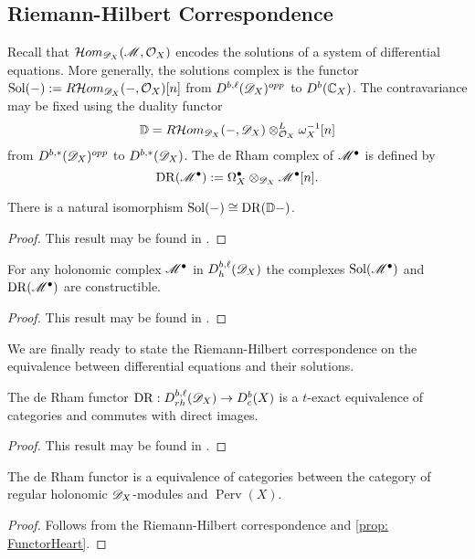 \subsection{Riemann-Hilbert Correspondence}
  Recall that $\mathcal{H}om_{\mathscr{D}_X}(\mathscr{M}, \mathcal{O}_X)$ encodes the solutions of a system of differential equations.
  More generally, the solutions complex is the functor $\operatorname{Sol}({-}) := R \mathcal{H}om_{\mathscr{D}_X}({-},\mathcal{O}_X)[n]$ from $D^{b,\ell}(\mathscr{D}_X)^{opp}$ to $D^{b}(\mathbb{C}_X)$.
  The contravariance may be fixed using the duality functor
  $$\mathbb{D} = R\mathcal{H}om_{\mathscr{D}_X}({-},\mathscr{D}_X)\otimes_{\mathcal{O}_X}^L\omega_X^{-1}[n]$$
  from $D^{b,*}(\mathscr{D}_X)^{opp}$ to $D^{b,*}(\mathscr{D}_X)$.
  The de Rham complex of $\mathscr{M}^\bullet$ is defined by
  $$\operatorname{DR}(\mathscr{M}^\bullet):=\Omega_X^\bullet \otimes_{\mathscr{D}_X} \mathscr{M}^\bullet[n]. $$
  \begin{proposition}
    There is a natural isomorphism $\operatorname{Sol}({-}) \cong \operatorname{DR}(\mathbb{D}{-})$.
  \end{proposition}
  \begin{proof}
    This result may be found in \cite[Chapter 5]{dimca2004sheaves}.
  \end{proof}
  \begin{proposition}
    For any holonomic complex $\mathscr{M}^\bullet$ in $D_h^{b,\ell}(\mathscr{D}_X)$ the complexes $\operatorname{Sol}(\mathscr{M}^\bullet)$ and $\operatorname{DR}(\mathscr{M}^\bullet)$ are constructible.
  \end{proposition}
  \begin{proof}
    This result may be found in \cite[Chapter 5]{dimca2004sheaves}.
  \end{proof}
  We are finally ready to state the Riemann-Hilbert correspondence on the equivalence between differential equations and their solutions.
  \begin{theorem}
    The de Rham functor $\operatorname{DR}:D_{rh}^{b,\ell}(\mathscr{D}_X) \to D_c^b(X)$ is a $t$-exact equivalence of categories and commutes with direct images.
  \end{theorem}
  \begin{proof}
    This result may be found in \cite[Chapter 5]{dimca2004sheaves}.
  \end{proof}
  \begin{corollary}
    The de Rham functor is a equivalence of categories between the category of regular holonomic $\mathscr{D}_X$-modules and $\operatorname{Perv}(X)$.
  \end{corollary}
  \begin{proof}
    Follows from the Riemann-Hilbert correspondence and \cref{prop: FunctorHeart}.
  \end{proof}

